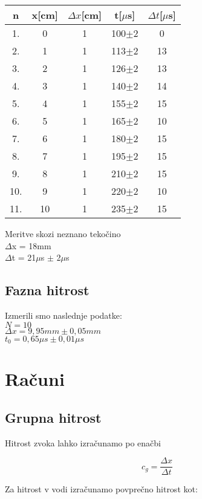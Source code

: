 \documentclass[a4paper]{report}
\begin{document}
\begin{centering}
 	
    \begin{tabular}{|c|c|c|c|c|}
    \hline
    n & x[cm] & $\Delta x$[cm] & t[$\mu$s] & $\Delta t$[$\mu$s]\\
    \hline
    1. & 0 & 1 & 100$\pm$2 & 0\\
    2. & 1 & 1 & 113$\pm$2 & 13\\
    3. & 2 & 1 & 126$\pm$2 & 13\\
    4. & 3 & 1 & 140$\pm$2 & 14\\
    5. & 4 & 1 & 155$\pm$2 & 15\\
    6. & 5 & 1 & 165$\pm$2 & 10\\
    7. & 6 & 1 & 180$\pm$2 & 15\\
    8. & 7 & 1 & 195$\pm$2 & 15\\
    9. & 8 & 1 & 210$\pm$2 & 15\\
    10. & 9 & 1 & 220$\pm$2 & 10\\
    11. & 10 & 1 & 235$\pm$2 & 15\\
    \hline
    \end{tabular}
    
\end{centering}

\noindent Meritve skozi neznano tekočino\\
$\Delta$x = 18mm\\
$\Delta$t = 21$\mu$s $\pm$ 2$\mu$s \\

\section*{Fazna hitrost}
Izmerili smo naslednje podatke:\\
$N = 10$\\
$\Delta x = 9,95mm \pm 0,05mm$\\
$t_0=0,65 \mu s \pm 0,01\mu s$

\chapter*{Računi}
\section*{Grupna hitrost}
Hitrost zvoka lahko izračunamo po enačbi

\[c_g = \frac{\Delta x}{\Delta t}\]

\noindent Za hitrost v vodi izračunamo povprečno hitrost kot: 
\end{document}
